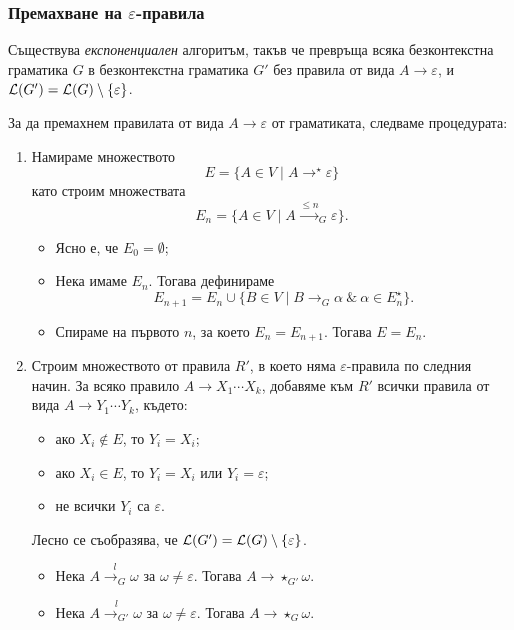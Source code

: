 \subsubsection*{Премахване на $\varepsilon$-правила}

\begin{lemma}
  Съществува {\em експоненциален} алгоритъм, такъв че превръща всяка безконтекстна граматика $G$ в безконтекстна граматика $G'$ без правила от вида $A \to \varepsilon$,
  и $\mathcal{L}(G') = \mathcal{L}(G) \setminus \{\varepsilon\}$.
\end{lemma}
\begin{hint}
  За да премахнем правилата от вида $A \to \varepsilon$ от граматиката, следваме процедурата:
  \begin{enumerate}[1)]
  \item 
    Намираме множеството
    \[E = \{A \in V \mid A \to^\star \varepsilon\}\]
    като строим множествата
    \[E_n = \{A \in V \mid A \stackrel{\leq n}{\to}_G \varepsilon \}.\]
    \begin{itemize}[-]
    \item
      Ясно е, че $E_0 = \emptyset$;
    \item
      Нека имаме $E_n$. Тогава дефинираме
      \[E_{n+1} = E_n \cup \{ B \in V \mid B \to_G \alpha\ \&\ \alpha \in E^\star_n\}.\]
    \item
      Спираме на първото $n$, за което $E_n = E_{n+1}$. Тогава $E = E_n$.    
    \end{itemize}
  \item
    Строим множеството от правила $R'$, в което няма $\varepsilon$-правила по следния начин.
    За всяко правило $A \to X_1\cdots X_k$,
    добавяме към $R'$ всички правила от вида $A \to Y_1\cdots Y_k$, където:
    \begin{itemize}[-]
    \item 
      ако $X_i \not\in E$, то $Y_i = X_i$;
    \item
      ако $X_i \in E$, то $Y_i = X_i$ или $Y_i = \varepsilon$;
    \item
      не всички $Y_i$ са $\varepsilon$.
    \end{itemize}
    Лесно се съобразява, че $\mathcal{L}(G') = \mathcal{L}(G) \setminus \{\varepsilon\}$.
    \begin{itemize}
    \item
      Нека $A \stackrel{l}{\to_G} \omega$ за $\omega \neq \varepsilon$. Тогава $A \to\star_{G'} \omega$.
    \item
      Нека $A \stackrel{l}{\to_{G'}} \omega$ за $\omega \neq \varepsilon$. Тогава $A \to\star_{G} \omega$.
    \end{itemize}
  \end{enumerate}
\end{hint}

